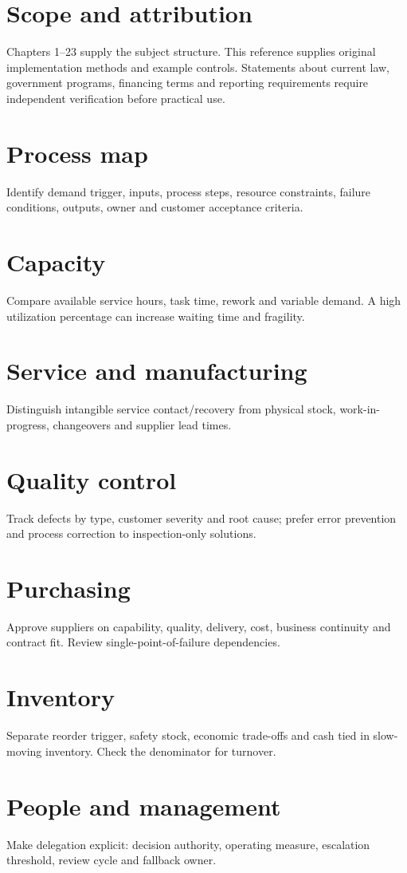 \documentclass[11pt]{article}
\begin{document}
\SuiteOpen\tableofcontents
\section{Scope and attribution}
Chapters 1--23 supply the subject structure. This reference supplies original implementation methods and example controls. Statements about current law, government programs, financing terms and reporting requirements require independent verification before practical use.
\section{Process map}
Identify demand trigger, inputs, process steps, resource constraints, failure conditions, outputs, owner and customer acceptance criteria.
\section{Capacity}
Compare available service hours, task time, rework and variable demand. A high utilization percentage can increase waiting time and fragility.
\section{Service and manufacturing}
Distinguish intangible service contact/recovery from physical stock, work-in-progress, changeovers and supplier lead times.
\section{Quality control}
Track defects by type, customer severity and root cause; prefer error prevention and process correction to inspection-only solutions.
\section{Purchasing}
Approve suppliers on capability, quality, delivery, cost, business continuity and contract fit. Review single-point-of-failure dependencies.
\section{Inventory}
Separate reorder trigger, safety stock, economic trade-offs and cash tied in slow-moving inventory. Check the denominator for turnover.
\section{People and management}
Make delegation explicit: decision authority, operating measure, escalation threshold, review cycle and fallback owner.
\end{document}
